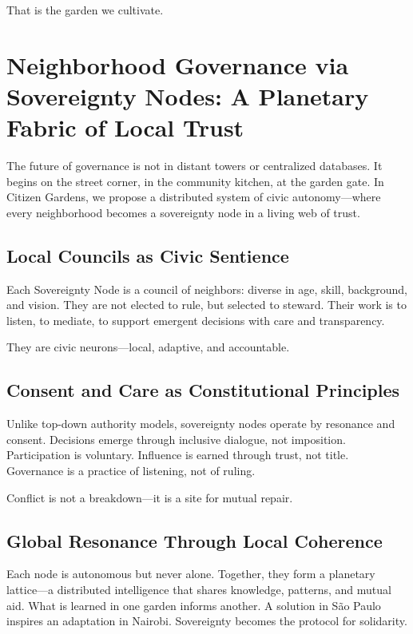 \documentclass[12pt]{article}
\begin{document}
That is the garden we cultivate.


\section{Neighborhood Governance via Sovereignty Nodes: A Planetary Fabric of Local Trust}

The future of governance is not in distant towers or centralized databases. It begins on the street corner, in the community kitchen, at the garden gate. In Citizen Gardens, we propose a distributed system of civic autonomy—where every neighborhood becomes a sovereignty node in a living web of trust.

\subsection{Local Councils as Civic Sentience}

Each Sovereignty Node is a council of neighbors: diverse in age, skill, background, and vision. They are not elected to rule, but selected to steward. Their work is to listen, to mediate, to support emergent decisions with care and transparency.

They are civic neurons—local, adaptive, and accountable.

\subsection{Consent and Care as Constitutional Principles}

Unlike top-down authority models, sovereignty nodes operate by resonance and consent. Decisions emerge through inclusive dialogue, not imposition. Participation is voluntary. Influence is earned through trust, not title. Governance is a practice of listening, not of ruling.

Conflict is not a breakdown—it is a site for mutual repair.

\subsection{Global Resonance Through Local Coherence}

Each node is autonomous but never alone. Together, they form a planetary lattice—a distributed intelligence that shares knowledge, patterns, and mutual aid. What is learned in one garden informs another. A solution in São Paulo inspires an adaptation in Nairobi. Sovereignty becomes the protocol for solidarity.
\end{document}
